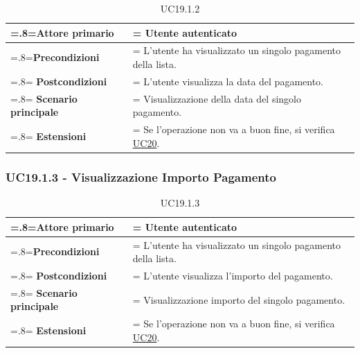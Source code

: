             \begin{table}[H]
                \centering
                \renewcommand{\arraystretch}{1.8}
                \renewcommand\tabularxcolumn[1]{m{#1}}
                \begin{tabularx}{0.9\textwidth} {
                    >{\hsize=.8\hsize\linewidth=\hsize}X
                    >{\hsize=1.2\hsize\linewidth=\hsize}X}
                    \hline
                    \textbf{Attore primario} & Utente autenticato \\
                    \hline
                    \textbf{Precondizioni} & L'utente ha visualizzato un singolo pagamento della lista. \\
                    \hline
                    \textbf{Postcondizioni} & L'utente visualizza la data del pagamento. \\
                    \hline
                    \textbf{Scenario principale} & Visualizzazione della data del singolo pagamento. \\
                    \hline
                    \textbf{Estensioni} & Se l'operazione non va a buon fine, si verifica \hyperref[UC20]{UC20}. \\
                    \hline
                \end{tabularx}
                \caption{UC19.1.2}
            \end{table}

        \subsubsection{UC19.1.3 - Visualizzazione Importo Pagamento}
        \label{UC19.1.3}

            \begin{table}[H]
                \centering
                \renewcommand{\arraystretch}{1.8}
                \renewcommand\tabularxcolumn[1]{m{#1}}
                \begin{tabularx}{0.9\textwidth} {
                    >{\hsize=.8\hsize\linewidth=\hsize}X
                    >{\hsize=1.2\hsize\linewidth=\hsize}X}
                    \hline
                    \textbf{Attore primario} & Utente autenticato \\
                    \hline
                    \textbf{Precondizioni} & L'utente ha visualizzato un singolo pagamento della lista. \\
                    \hline
                    \textbf{Postcondizioni} & L'utente visualizza l'importo del pagamento. \\
                    \hline
                    \textbf{Scenario principale} & Visualizzazione importo del singolo pagamento. \\
                    \hline
                    \textbf{Estensioni} & Se l'operazione non va a buon fine, si verifica \hyperref[UC20]{UC20}. \\
                    \hline
                \end{tabularx}
                \caption{UC19.1.3}
            \end{table}
        
